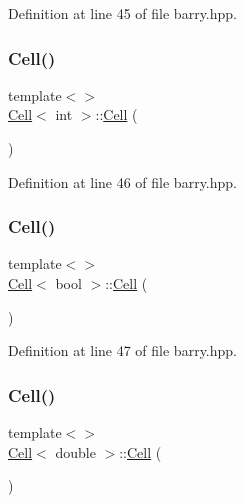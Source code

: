 Definition at line 45 of file barry.\+hpp.

\mbox{\label{class_cell_a7019dc2ccc1e14bd17aa9f03b377a199}} 
\subsubsection{\texorpdfstring{Cell()}{Cell()}\hspace{0.1cm}{\footnotesize\ttfamily [7/12]}}
{\footnotesize\ttfamily template$<$$>$ \\
\hyperlink{class_cell}{Cell}$<$ int $>$\+::\hyperlink{class_cell}{Cell} (\begin{DoxyParamCaption}{ }\end{DoxyParamCaption})\hspace{0.3cm}{\ttfamily [inline]}}



Definition at line 46 of file barry.\+hpp.

\mbox{\label{class_cell_aef4b64101b33e2349ceea132b962d137}} 
\subsubsection{\texorpdfstring{Cell()}{Cell()}\hspace{0.1cm}{\footnotesize\ttfamily [8/12]}}
{\footnotesize\ttfamily template$<$$>$ \\
\hyperlink{class_cell}{Cell}$<$ bool $>$\+::\hyperlink{class_cell}{Cell} (\begin{DoxyParamCaption}{ }\end{DoxyParamCaption})\hspace{0.3cm}{\ttfamily [inline]}}



Definition at line 47 of file barry.\+hpp.

\mbox{\label{class_cell_a5ecdaddaf4661a9a8fe6f0ed61595847}} 
\subsubsection{\texorpdfstring{Cell()}{Cell()}\hspace{0.1cm}{\footnotesize\ttfamily [9/12]}}
{\footnotesize\ttfamily template$<$$>$ \\
\hyperlink{class_cell}{Cell}$<$ double $>$\+::\hyperlink{class_cell}{Cell} (\begin{DoxyParamCaption}{ }\end{DoxyParamCaption})\hspace{0.3cm}{\ttfamily [inline]}}




